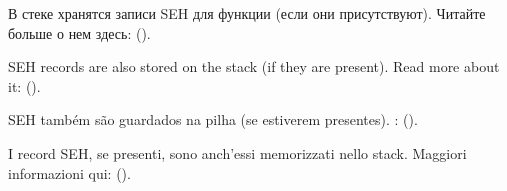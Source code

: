 
\ifdefined\RUSSIAN
В стеке хранятся записи \ac{SEH} для функции (если они присутствуют).
Читайте больше о нем здесь: ().
\fi %

\ifdefined\ENGLISH
\ac{SEH} records are also stored on the stack (if they are present).
Read more about it: ().
\fi %

\ifdefined\BRAZILIAN
\ac{SEH} também são guardados na pilha (se estiverem presentes).
\PTBRph{}: ().
\fi %

\ifdefined\ITALIAN
I record \ac{SEH}, se presenti, sono anch'essi memorizzati nello stack.
Maggiori informazioni qui: ().
\fi %

